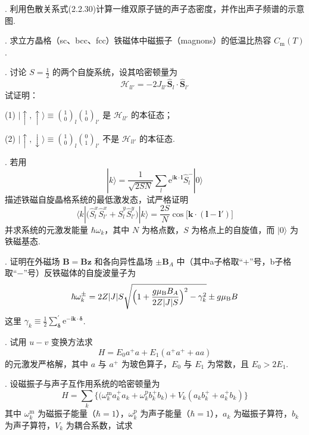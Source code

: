 {.} 利用色散关系式(2.2.30)计算一维双原子链的声子态密度，并作出声子频谱的示意图.

{.} 求立方晶格（sc、bcc、fcc）铁磁体中磁振子（magnons）的低温比热容 $C_{\mathrm{m}}(T)$.

{.} 讨论 $S=\frac{1}{2}$ 的两个自旋系统，设其哈密顿量为
\begin{equation*}
  \mathcal{H}_{ll'}=-2J_{ll'}\hat{\boldsymbol{S}}_{l}\cdot\hat{\boldsymbol{S}}_{l'}
\end{equation*}
试证明：

(1) $|\uparrow,\uparrow\rangle\equiv\binom{1}{0}_{\! l}\binom{1}{0}_{\! l'}$ 是 $\mathcal{H}_{ll'}$ 的本征态；

(2) $|\uparrow,\downarrow\rangle\equiv\binom{1}{0}_{\! l}\binom{0}{1}_{\! l'}$ 不是 $\mathcal{H}_{ll'}$ 的本征态.

{.} 若用
\begin{equation*}
  |k\rangle=\frac{1}{\sqrt{2SN}}\sum_{l}\mathrm{e}^{\mathrm{i}\boldsymbol{k}\cdot\boldsymbol{l}}\hat{S}_{l}^{-}|0\rangle
\end{equation*}
描述铁磁自旋晶格系统的最低激发态，试严格证明
\begin{equation*}
  \langle k|\bigl(\hat{S}_{l}^{x}\hat{S}_{l'}^{x}+\hat{S}_{l}^{y}\hat{S}_{l'}^{y}\bigr)|k\rangle
  =\frac{2S}{N}\cos\bigl[\boldsymbol{k}\cdot(\boldsymbol{l}-\boldsymbol{l}')\bigr]
\end{equation*}
并求系统的元激发能量 $\hbar\omega_{k}$，其中 $N$ 为格点数，$S$ 为格点上的自旋值，而 $|0\rangle$ 为铁磁基态.

{.} 证明在外磁场 $\boldsymbol{B}=\boldsymbol{B}\boldsymbol{z}$ 和各向异性晶场 $\pm\boldsymbol{B}_{A}$ 中（其中a子格取“+”号，b子格取“−”号）反铁磁体的自旋波量子为
\begin{equation*}
  \hbar\omega_{k}^{\pm}=2Z|J|S\sqrt{\Bigl(1+\frac{g\mu_{\mathrm{B}}B_{A}}{2Z|J|S}\Bigr)^{2}-\gamma_{k}^{2}}\pm g\mu_{\mathrm{B}}B
\end{equation*}
这里 $\gamma_{k}\equiv\frac{1}{2}\sum_{\boldsymbol{\delta}}^{\prime}\mathrm{e}^{-\mathrm{i}\boldsymbol{k}\cdot\boldsymbol{\delta}}$.

{.} 试用 $u-v$ 变换方法求
\begin{equation*}
  H=E_{0}a^{+}a+E_{1}\left(a^{+}a^{+}+aa\right)
\end{equation*}
的元激发严格解，其中 $a$ 与 $a^{+}$ 为玻色算子，$E_{0}$ 与 $E_{1}$ 为常数，且 $E_{0}>2E_{1}$.

{.} 设磁振子与声子互作用系统的哈密顿量为
\begin{equation*}
  H=\sum_{k}\bigl\{\bigl(\omega_{k}^{\mathrm{m}}a^{+}_{k}a_{k}
  +\omega_{k}^{\mathrm{p}}b^{+}_{k}b_{k}\bigr)
  +V_{k}\left(a_{k}b^{+}_{k}+a^{+}_{k}b_{k}\right)\bigr\}
\end{equation*}
其中 $\omega_{k}^{\mathrm{m}}$ 为磁振子能量（$\hbar=1$），$\omega_{k}^{\mathrm{p}}$ 为声子能量（$\hbar=1$），$a_{k}$ 为磁振子算符，$b_{k}$ 为声子算符，$V_{k}$ 为耦合系数，试求

